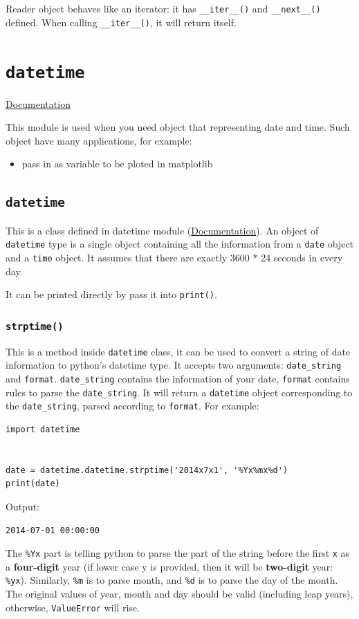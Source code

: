 \documentclass[12pt]{book}
\begin{document}
Reader object behaves like an iterator: it has \texttt{\_\_iter\_\_()} and \texttt{\_\_next\_\_()} defined. When calling \texttt{\_\_iter\_\_()}, it will return itself. 
\chapter{\texttt{datetime}}
\label{sec:org7871597}
\href{https://docs.python.org/3/library/datetime.html}{Documentation}

This module is used when you need object that representing date and time. Such object have many applications, for example:
\begin{itemize}
\item pass in as variable to be ploted in matplotlib
\end{itemize}

\section{\texttt{datetime}}
\label{sec:org9861620}
This is a class defined in datetime module (\href{https://docs.python.org/3/library/datetime.html\#datetime.datetime}{Documentation}). An object of \texttt{datetime} type is a single object containing all the information from a \texttt{date} object and a \texttt{time} object. It assumes that there are exactly 3600 * 24 seconds in every day.

It can be printed directly by pass it into \texttt{print()}.
\subsection{\texttt{strptime()}}
\label{sec:orgaffcf75}
This is a method inside \texttt{datetime} class, it can be used to convert a string of date information to python's datetime type. It accepts two arguments: \texttt{date\_string} and \texttt{format}. \texttt{date\_string} contains the information of your date, \texttt{format} contains rules to parse the \texttt{date\_string}. It will return a \texttt{datetime} object corresponding to the \texttt{date\_string}, parsed according to \texttt{format}. For example:
\begin{verbatim}
import datetime


date = datetime.datetime.strptime('2014x7x1', '%Yx%mx%d')
print(date)
\end{verbatim}
Output:
\begin{verbatim}
2014-07-01 00:00:00
\end{verbatim}
The \texttt{\%Yx} part is telling python to parse the part of the string before the first \texttt{x} as a \textbf{four-digit} year (if lower case y is provided, then it will be \textbf{two-digit} year: \texttt{\%yx}). Similarly, \texttt{\%m} is to parse month, and \texttt{\%d} is to parse the day of the month. The original values of year, month and day should be valid (including leap years), otherwise, \texttt{ValueError} will rise.
\end{document}
